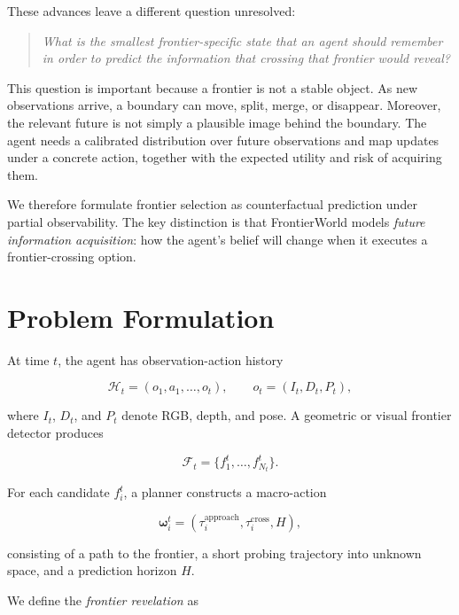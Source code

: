 \documentclass[10pt,twocolumn]{article}
\newcommand{\History}{\mathcal{H}}
\newcommand{\Frontiers}{\mathcal{F}}
\newcommand{\Option}{\boldsymbol{\omega}}
\begin{document}
These advances leave a different question unresolved:

\begin{quote}
\textit{What is the smallest frontier-specific state that an agent should
remember in order to predict the information that crossing that frontier would
reveal?}
\end{quote}

This question is important because a frontier is not a stable object. As new
observations arrive, a boundary can move, split, merge, or disappear. Moreover,
the relevant future is not simply a plausible image behind the boundary. The
agent needs a calibrated distribution over future observations and map
updates under a concrete action, together with the expected utility and risk
of acquiring them.

We therefore formulate frontier selection as counterfactual prediction under
partial observability. The key distinction is that FrontierWorld models
\emph{future information acquisition}: how the agent's belief will change
when it executes a frontier-crossing option.

\section{Problem Formulation}

At time \(t\), the agent has observation-action history

\begin{equation}
\History_t =
\left(o_1,a_1,\ldots,o_t\right),
\qquad
o_t=(I_t,D_t,P_t),
\end{equation}

where \(I_t\), \(D_t\), and \(P_t\) denote RGB, depth, and pose. A geometric or
visual frontier detector produces

\begin{equation}
\Frontiers_t=\{f_1^t,\ldots,f_{N_t}^t\}.
\end{equation}

For each candidate \(f_i^t\), a planner constructs a macro-action

\begin{equation}
\Option_i^t =
\left(\tau_i^{\mathrm{approach}},
\tau_i^{\mathrm{cross}},
H\right),
\end{equation}

consisting of a path to the frontier, a short probing trajectory into unknown
space, and a prediction horizon \(H\).

We define the \emph{frontier revelation} as
\end{document}
